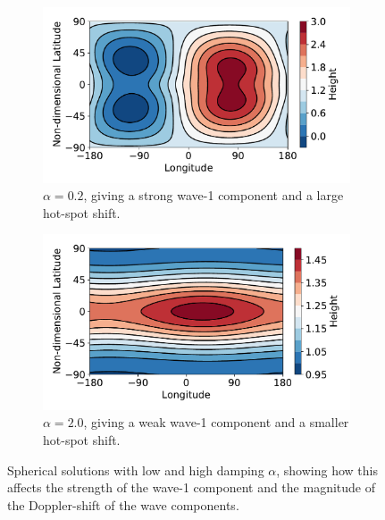\begin{figure}
  \centering
  \begin{subfigure}[t]{0.48\textwidth}
    \includegraphics[width=\textwidth]{figures/wave-mean-flow/spherical-low-damp.pdf}
    \caption{$\alpha = 0.2$, giving a strong wave-1 component and a large hot-spot shift.}
    \label{fig:spherical-low-damp}
  \end{subfigure}
  \quad
  \begin{subfigure}[t]{0.48\textwidth}
    \includegraphics[width=\textwidth]{figures/wave-mean-flow/spherical-high-damp.pdf}
    \caption{$\alpha = 2.0$, giving a weak wave-1 component and a smaller hot-spot shift.}
    \label{fig:spherical-high-damp}
  \end{subfigure}
  \caption{Spherical solutions with low and high damping $\alpha$, showing how this affects the strength of the wave-1 component and the magnitude of the Doppler-shift of the wave components.}
  \label{fig:spherical-damp-effect}
\end{figure}


